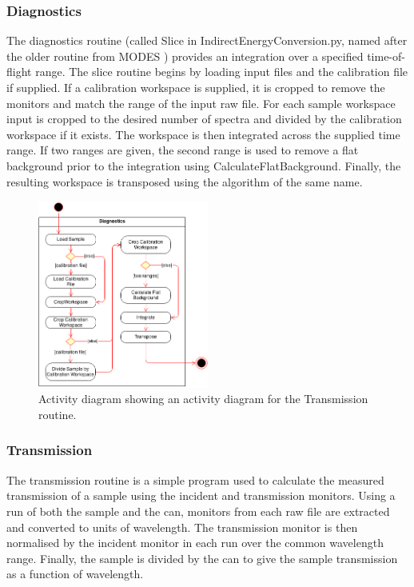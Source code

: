 \documentclass[paper=a4, fontsize=11pt]{scrartcl}	%
\numberwithin{equation}{section}															%
\numberwithin{figure}{section}																%
\numberwithin{table}{section}																%
\begin{document}
\subsubsection{Diagnostics}
The diagnostics routine (called Slice in IndirectEnergyConversion.py, named after the older routine from MODES \cite{wshowells2010}) provides an integration over a specified time-of-flight range. The slice routine begins by loading input files and the calibration file if supplied. If a calibration workspace is supplied, it is cropped to remove the monitors and match the range of the input raw file. For each sample workspace input is cropped to the desired number of spectra and divided by the calibration workspace if it exists. The workspace is then integrated across the supplied time range. If two ranges are given, the second range is used to remove a flat background prior to the integration using CalculateFlatBackground. Finally, the resulting workspace is transposed using the algorithm of the same name.

\begin{figure}[H]
\centering
\includegraphics[width=0.5\textwidth]{img/uml/activity_diagrams/Diagnostics_activity.png}
\caption{Activity diagram showing an activity diagram for the Transmission routine.}
\label{fig:c2e-diagnostics-activity-diagram}
\end{figure}

\subsubsection{Transmission}
The transmission routine is a simple program used to calculate the measured transmission of a sample using the incident and transmission monitors. Using a run of both the sample and the can, monitors from each  raw file are extracted and converted to units of wavelength. The transmission monitor is then normalised by the incident monitor in each run over the common wavelength range. Finally, the sample is divided by the can to give the sample transmission as a function of wavelength.
\end{document}
